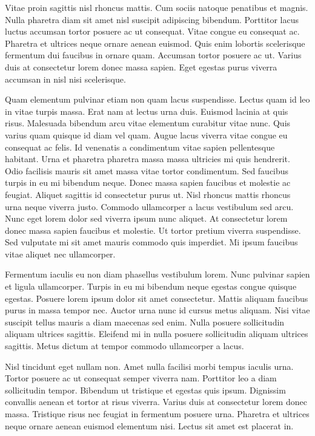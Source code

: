 \documentclass[]{tufte-handout}
\begin{document}
Vitae proin sagittis nisl rhoncus mattis. Cum sociis natoque penatibus
et magnis. Nulla pharetra diam sit amet nisl suscipit adipiscing
bibendum. Porttitor lacus luctus accumsan tortor posuere ac ut
consequat. Vitae congue eu consequat ac. Pharetra et ultrices neque
ornare aenean euismod. Quis enim lobortis scelerisque fermentum dui
faucibus in ornare quam. Accumsan tortor posuere ac ut. Varius duis at
consectetur lorem donec massa sapien. Eget egestas purus viverra
accumsan in nisl nisi scelerisque.

Quam elementum pulvinar etiam non quam lacus suspendisse. Lectus quam id
leo in vitae turpis massa. Erat nam at lectus urna duis. Euismod lacinia
at quis risus. Malesuada bibendum arcu vitae elementum curabitur vitae
nunc. Quis varius quam quisque id diam vel quam. Augue lacus viverra
vitae congue eu consequat ac felis. Id venenatis a condimentum vitae
sapien pellentesque habitant. Urna et pharetra pharetra massa massa
ultricies mi quis hendrerit. Odio facilisis mauris sit amet massa vitae
tortor condimentum. Sed faucibus turpis in eu mi bibendum neque. Donec
massa sapien faucibus et molestie ac feugiat. Aliquet sagittis id
consectetur purus ut. Nisl rhoncus mattis rhoncus urna neque viverra
justo. Commodo ullamcorper a lacus vestibulum sed arcu. Nunc eget lorem
dolor sed viverra ipsum nunc aliquet. At consectetur lorem donec massa
sapien faucibus et molestie. Ut tortor pretium viverra suspendisse. Sed
vulputate mi sit amet mauris commodo quis imperdiet. Mi ipsum faucibus
vitae aliquet nec ullamcorper.

Fermentum iaculis eu non diam phasellus vestibulum lorem. Nunc pulvinar
sapien et ligula ullamcorper. Turpis in eu mi bibendum neque egestas
congue quisque egestas. Posuere lorem ipsum dolor sit amet consectetur.
Mattis aliquam faucibus purus in massa tempor nec. Auctor urna nunc id
cursus metus aliquam. Nisi vitae suscipit tellus mauris a diam maecenas
sed enim. Nulla posuere sollicitudin aliquam ultrices sagittis. Eleifend
mi in nulla posuere sollicitudin aliquam ultrices sagittis. Metus dictum
at tempor commodo ullamcorper a lacus.

Nisl tincidunt eget nullam non. Amet nulla facilisi morbi tempus iaculis
urna. Tortor posuere ac ut consequat semper viverra nam. Porttitor leo a
diam sollicitudin tempor. Bibendum ut tristique et egestas quis ipsum.
Dignissim convallis aenean et tortor at risus viverra. Varius duis at
consectetur lorem donec massa. Tristique risus nec feugiat in fermentum
posuere urna. Pharetra et ultrices neque ornare aenean euismod elementum
nisi. Lectus sit amet est placerat in.
\end{document}
